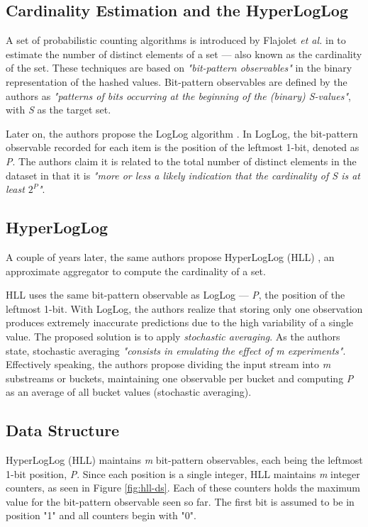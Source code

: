 \subsection{Cardinality Estimation and the HyperLogLog} \label{sec:hyper-log-log}

A set of probabilistic counting algorithms is introduced by Flajolet \emph{et al.} in \cite{Flajolet-PCA} to estimate the number of distinct elements of a set --- also known as the cardinality of the set. These techniques are based on \textit{"bit-pattern observables"} in the binary representation of the hashed values. Bit-pattern observables are defined by the authors as \textit{"patterns of bits occurring at the beginning of the (binary) S-values"}, with \textit{S} as the target set.

Later on, the authors propose the LogLog algorithm \cite{Flajolet-LogLog}. In LogLog, the bit-pattern observable recorded for each item is the position of the leftmost 1-bit, denoted as \textit{P}. The authors claim it is related to the total number of distinct elements in the dataset in that it is \textit{"more or less a likely indication that the cardinality of S is at least $2^P$"}.


\subsection*{HyperLogLog}
A couple of years later, the same authors propose HyperLogLog (HLL) \cite{Flajolet-HLL}, an approximate aggregator to compute the cardinality of a set. 

HLL uses the same bit-pattern observable as LogLog --- \textit{P}, the position of the leftmost 1-bit. With LogLog, the authors realize that storing only one observation produces extremely inaccurate predictions due to the high variability of a single value. The proposed solution is to apply \textit{stochastic averaging}. As the authors state, stochastic averaging \textit{"consists in emulating the effect of m experiments"}. Effectively speaking, the authors propose dividing the input stream into \textit{m} substreams or buckets, maintaining one observable per bucket and computing \textit{P} as an average of all bucket values (stochastic averaging).

\subsection*{Data Structure}
HyperLogLog (HLL) maintains \textit{m} bit-pattern observables, each being the leftmost 1-bit position, \textit{P}. Since each position is a single integer, HLL maintains \textit{m} integer counters, as seen in Figure \ref{fig:hll-ds}. Each of these counters holds the maximum value for the bit-pattern observable seen so far. The first bit is assumed to be in position "1" and all counters begin with "0".

